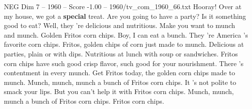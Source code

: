 \begin{textsample}{NEG Dim 7 – 1960 – Score -1.00 – 1960/tv\_com\_1960\_66.txt}  \label{ex:f7_neg_074}
Hooray!
Over at my house, we got a \textbf{special} treat.
Are you going to have a party?
Is it something good to eat?
Well, they 're delicious and nutritious.
Make you want to munch and munch.
Golden Fritos corn chips.
Boy, I can eat a bunch.
They 're America 's favorite corn chips.
Fritos, golden chips of corn just made to munch.
Delicious at parties, plain or with dips.
Nutritious at lunch with soup or sandwiches.
Fritos corn chips have such good crisp flavor, such good for your nourishment.
There 's contentment in every munch.
Get Fritos today, the golden corn chips made to munch.
Munch, munch, munch a bunch of Fritos corn chips.
It 's not polite to smack your lips.
But you can't help it with Fritos corn chips.
Munch, munch, munch a bunch of Fritos corn chips.
Fritos corn chips.

\end{textsample}

